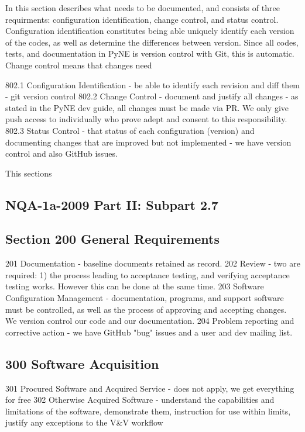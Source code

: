 \documentclass{anstrans}
\begin{document}
In this section describes what needs to be documented, and consists of three requirments: configuration identification, change control, and status control. Configuration identification constitutes being able uniquely identify each version of the codes, as well as determine the differences between version. Since all codes, tests, and documentation in PyNE is version control with Git, this is automatic. Change control means that changes need 

802.1 Configuration Identification - be able to identify each revision and diff them - git version control
802.2 Change Control - document and justify all changes - as stated in the PyNE dev guide, all changes must be made via PR. We only give push access to individually who prove adept and consent to this responsibility.
802.3 Status Control - that status of each configuration (version) and documenting changes that are improved but not implemented - we have version control and also GitHub issues.

This sections 



\subsection{NQA-1a-2009 Part II: Subpart 2.7}

\subsection{Section 200 General Requirements}

201 Documentation - baseline documents retained as record.
202 Review  - two are required: 1) the process leading to acceptance testing, and verifying acceptance testing works. However this can be done at the same time.
203 Software Configuration Management - documentation, programs, and support software must be controlled, as well as the process of approving and accepting changes. We version control our code and our documentation.
204 Problem reporting and corrective action - we have GitHub "bug" issues and a user and dev mailing list.

\subsection{300 Software Acquisition}
301 Procured Software and Acquired Service - does not apply, we get everything for free
302 Otherwise Acquired Software - understand the capabilities and limitations of the software, demonstrate them, instruction for use within limits, justify any exceptions to the V\&V workflow
\end{document}
